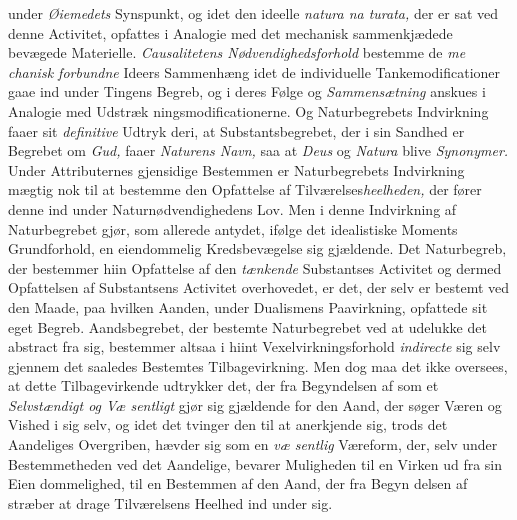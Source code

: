 under \emph{Øiemedets} Synspunkt, og idet den ideelle \emph{natura na\-%
turata,} der er sat ved denne Activitet, opfattes i Analogie
med det mechanisk sammenkjædede bevægede Materielle.
\emph{Causalitetens Nødvendighedsforhold} bestemme de \emph{me\-%
chanisk forbundne} Ideers Sammenhæng idet de individuelle
Tankemodificationer gaae ind under Tingens Begreb, og i deres
Følge og \emph{Sammensætning} anskues i Analogie med Udstræk\-%
ningsmodificationerne. Og Naturbegrebets Indvirkning faaer
sit \emph{definitive} Udtryk deri, at Substantsbegrebet, der i sin
Sandhed er Begrebet om \emph{Gud,} faaer \emph{Naturens Navn,} saa
at \emph{Deus} og \emph{Natura} blive \emph{Synonymer.} Under Attributernes
gjensidige Bestemmen er Naturbegrebets Indvirkning mægtig
nok til at bestemme den Opfattelse af Tilværelses\emph{heelheden,}
der fører denne ind under Naturnødvendighedens Lov. Men i
denne Indvirkning af Naturbegrebet gjør, som allerede antydet,
ifølge det idealistiske Moments Grundforhold, en eiendommelig
Kredsbevægelse sig gjældende. Det Naturbegreb, der bestemmer
hiin Opfattelse af den \emph{tænkende} Substantses Activitet og dermed
Opfattelsen af Substantsens Activitet overhovedet, er det, der selv
er bestemt ved den Maade, paa hvilken Aanden, under Dualismens
Paavirkning, opfattede sit eget Begreb. Aandsbegrebet, der
bestemte Naturbegrebet ved at udelukke det abstract fra sig,
bestemmer altsaa i hiint Vexelvirkningsforhold \emph{indirecte} sig
selv gjennem det saaledes Bestemtes Tilbagevirkning. Men
dog maa det ikke oversees, at dette Tilbagevirkende udtrykker
det, der fra Begyndelsen af som et \emph{Selvstændigt og Væ\-%
sentligt} gjør sig gjældende for den Aand, der søger Væren
og Vished i sig selv, og idet det tvinger den til at anerkjende
sig, trods det Aandeliges Overgriben, hævder sig som en \emph{væ\-%
sentlig} Væreform, der, selv under Bestemmetheden ved det
Aandelige, bevarer Muligheden til en Virken ud fra sin Eien\-%
dommelighed, til en Bestemmen af den Aand, der fra Begyn\-%
delsen af stræber at drage Tilværelsens Heelhed ind under sig.

